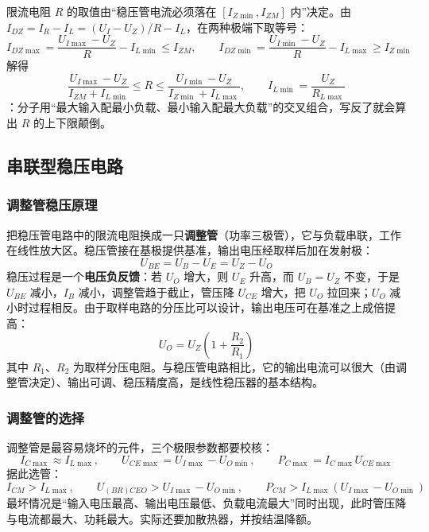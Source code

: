 限流电阻 $R$ 的取值由“稳压管电流必须落在 $[I_{Z\min},I_{ZM}]$ 内”决定。由 $I_{DZ}=I_R-I_L=(U_I-U_Z)/R-I_L$，在两种极端下取等号：
\begin{equation}
I_{DZ\max}=\frac{U_{I\max}-U_Z}{R}-I_{L\min}\le I_{ZM},\qquad
I_{DZ\min}=\frac{U_{I\min}-U_Z}{R}-I_{L\max}\ge I_{Z\min}
\end{equation}
解得
\begin{equation}
\frac{U_{I\max}-U_Z}{I_{ZM}+I_{L\min}}\le R\le\frac{U_{I\min}-U_Z}{I_{Z\min}+I_{L\max}},
\qquad I_{L\min}=\frac{U_Z}{R_{L\max}}
\end{equation}
：分子用“最大输入配最小负载、最小输入配最大负载”的交叉组合，写反了就会算出 $R$ 的上下限颠倒。

\subsection{串联型稳压电路}
\subsubsection{调整管稳压原理}
把稳压管电路中的限流电阻换成一只\textbf{调整管}（功率三极管），它与负载串联，工作在线性放大区。稳压管接在基极提供基准，输出电压经取样后加在发射极：
\begin{equation}
U_{BE}=U_B-U_E=U_Z-U_O
\end{equation}
稳压过程是一个\textbf{电压负反馈}：若 $U_O$ 增大，则 $U_E$ 升高，而 $U_B=U_Z$ 不变，于是 $U_{BE}$ 减小，$I_B$ 减小，调整管趋于截止，管压降 $U_{CE}$ 增大，把 $U_O$ 拉回来；$U_O$ 减小时过程相反。由于取样电路的分压比可以设计，输出电压可在基准之上成倍提高：
\begin{equation}
U_O=U_Z\left(1+\frac{R_2}{R_1}\right)
\end{equation}
其中 $R_1$、$R_2$ 为取样分压电阻。与稳压管电路相比，它的输出电流可以很大（由调整管决定）、输出可调、稳压精度高，是线性稳压器的基本结构。

\subsubsection{调整管的选择}
调整管是最容易烧坏的元件，三个极限参数都要校核：
\begin{equation}
I_{C\max}\approx I_{L\max},\qquad
U_{CE\max}=U_{I\max}-U_{O\min},\qquad
P_{C\max}=I_{C\max}U_{CE\max}
\end{equation}
据此选管：
\begin{equation}
I_{CM}>I_{L\max},\qquad
U_{(BR)CEO}>U_{I\max}-U_{O\min},\qquad
P_{CM}>I_{L\max}\left(U_{I\max}-U_{O\min}\right)
\end{equation}
最坏情况是“输入电压最高、输出电压最低、负载电流最大”同时出现，此时管压降与电流都最大、功耗最大。实际还要加散热器，并按结温降额。

